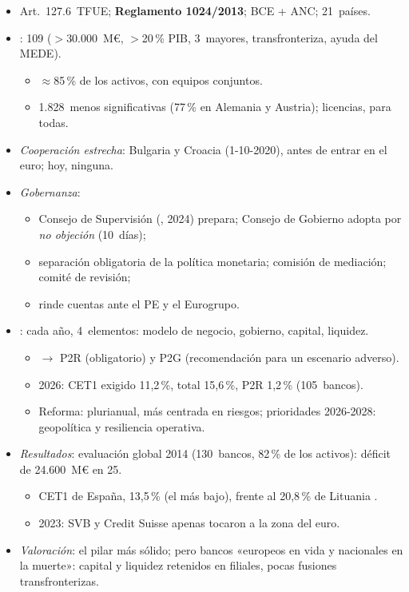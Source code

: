 \documentclass{article}
\begin{document}
\begin{columnas}
\begin{itemize}
\item Art.~127.6~TFUE; \textbf{Reglamento 1024/2013}; BCE + ANC; 21~países.
\item {}: 109 ($>$30.000~M€, $>$20\,\% PIB, 3~mayores, transfronteriza, ayuda del MEDE).
  \begin{itemize}
  \item $\approx$85\,\% de los activos, con equipos conjuntos.
  \item 1.828~menos significativas (77\,\% en Alemania y Austria); licencias, para todas.
  \end{itemize}
\item \emph{Cooperación estrecha}: Bulgaria y Croacia (1-10-2020), antes de entrar en el euro; hoy, ninguna.
\item \emph{Gobernanza}:
  \begin{itemize}
  \item Consejo de Supervisión (, 2024) prepara; Consejo de Gobierno adopta por \emph{no objeción} (10~días);
  \item separación obligatoria de la política monetaria; comisión de mediación; comité de revisión;
  \item rinde cuentas ante el PE y el Eurogrupo.
  \end{itemize}
\item {}: cada año, 4~elementos: modelo de negocio, gobierno, capital, liquidez.
  \begin{itemize}
  \item $\to$ P2R (obligatorio) y P2G (recomendación para un escenario adverso).
  \item 2026: CET1 exigido 11,2\,\%, total 15,6\,\%, P2R 1,2\,\% (105~bancos).
  \item Reforma: plurianual, más centrada en riesgos; prioridades 2026-2028: geopolítica y resiliencia operativa.
  \end{itemize}
\item \emph{Resultados}: evaluación global 2014 (130~bancos, 82\,\% de los activos): déficit de 24.600~M€ en 25.
  \begin{itemize}
  \item CET1 de España, 13,5\,\% (el más bajo), frente al 20,8\,\% de Lituania .
  \item 2023: SVB y Credit Suisse apenas tocaron a la zona del euro.
  \end{itemize}
\item \emph{Valoración}: el pilar más sólido; pero bancos «europeos en vida y nacionales en la muerte»: capital y liquidez retenidos en filiales, pocas fusiones transfronterizas.
\end{itemize}


\end{columnas}
\end{document}
